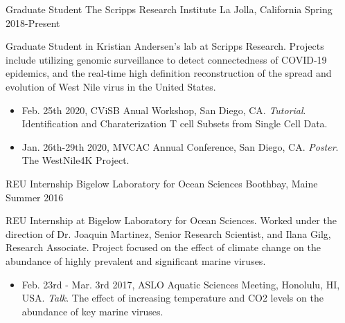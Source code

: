 

\begin{cventries}

  \cventry
    {Graduate Student} %
    {The Scripps Research Institute} %
    {La Jolla, California} %
    {Spring 2018-Present} %
    {
      \begin{cvitems} %
        \item {
          Graduate Student in Kristian Andersen’s lab at Scripps Research.
          Projects include utilizing genomic surveillance to detect connectedness of COVID-19 epidemics, and the real-time high definition reconstruction of the spread and evolution of West Nile virus in the United States.
          \begin{itemize}
            \item{Feb. 25th 2020, CViSB Anual Workshop, San Diego, CA. \textit{Tutorial}. Identification and Charaterization T cell Subsets from Single Cell Data.}
            \item{Jan. 26th-29th 2020, MVCAC Annual Conference, San Diego, CA. \textit{Poster}. The WestNile4K Project.}
          \end{itemize}
        }
      \end{cvitems}
    }

  \cventry
    {REU Internship} %
    {Bigelow Laboratory for Ocean Sciences} %
    {Boothbay, Maine} %
    {Summer 2016} %
    {
      \begin{cvitems}
        \item{
          REU Internship at Bigelow Laboratory for Ocean Sciences.
          Worked under the direction of Dr. Joaquin Martinez, Senior Research Scientist, and Ilana Gilg, Research Associate.
          Project focused on the effect of climate change on the abundance of highly prevalent and significant marine viruses.
          \begin{itemize}
            \item{Feb. 23rd - Mar. 3rd 2017, ASLO Aquatic Sciences Meeting, Honolulu, HI, USA. \textit{Talk}. The effect of increasing temperature and CO2 levels on the abundance of key marine viruses.}
          \end{itemize}
        }
      \end{cvitems}
    }

\end{cventries}
